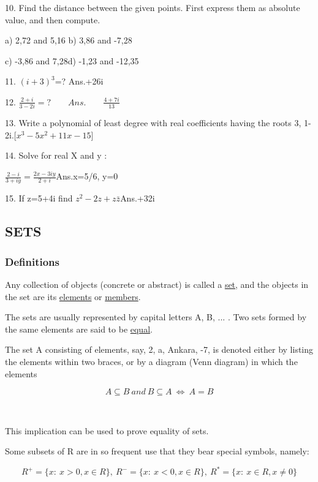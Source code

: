 \documentclass[11pt]{amsbook}
\begin{document}
10. Find the distance between the given points. First express them as absolute value, and then compute.
    
    a) 2,72 and 5,16 \qquad b) 3,86 and -7,28
    
	c) -3,86 and 7,28\qquad d) -1,23 and -12,35
    
    11. $(i+3)^3$=? \qquad Ans.+26i
    
    12. $\frac{2+i}{3-2i}=? \qquad Ans.\qquad \frac{4+7i}{13}$
    
    13. Write a polynomial of least degree with real coefficients having the roots 3, 1-2i.[$x^3-5x^2+11x-15$]
    
    14. Solve for real X and y :
    \begin{center}
	$\frac{2-i}{3+iy}=\frac{2x-3iy}{2+i}$\qquad Ans.\qquad x=5/6, y=0
	\end{center}
    15. If z=5+4i find $z^2-2z+z\bar{z}$\qquad Ans.+32i
	
    \subsection{SETS}
    \subsubsection{Definitions}
    \qquad Any collection of objects (concrete or abstract) is called a \underline{set}, and the objects in the set are its \underline{elements} or \underline{members}.
    
    \qquad The sets are usually represented by capital letters A, B, ... . Two sets formed by the same elements are said to be \underline{equal}.
    
    \qquad The set A consisting of elements, say, 2, a, Ankara, -7, is denoted either by listing the elements within two braces, or by a diagram (Venn diagram) in which the elements

$$A\subseteq B \ and \ B\subseteq A  \ \Longleftrightarrow \ A=B$$

\par \ \par This implication can be used to prove equality of sets.

Some subsets of R are in so frequent use that they bear special symbols, namely:

$$R^+=\{x: \ x>0,x\in R \}, \ R^-=\{x: \ x<0,x\in R \}, \ R^*=\{x: \ x\in R,x\neq 0 \}$$
\end{document}
